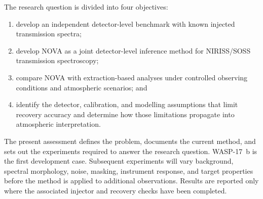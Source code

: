 
The research question is divided into four objectives:
\begin{enumerate}[label=\arabic*.,leftmargin=1.5em]
  \item develop an independent detector-level benchmark with known injected
  transmission spectra;
  \item develop NOVA as a joint detector-level inference method for
  NIRISS/SOSS transmission spectroscopy;
  \item compare NOVA with extraction-based analyses under controlled observing
  conditions and atmospheric scenarios; and
  \item identify the detector, calibration, and modelling assumptions that
  limit recovery accuracy and determine how those limitations propagate into
  atmospheric interpretation.
\end{enumerate}


The present assessment defines the problem, documents the current method, and
sets out the experiments required to answer the research question. WASP-17~b
is the first development case. Subsequent experiments will vary background,
spectral morphology, noise, masking, instrument response, and target
properties before the method is applied to additional observations. Results
are reported only where the associated injector and recovery checks have been
completed.
